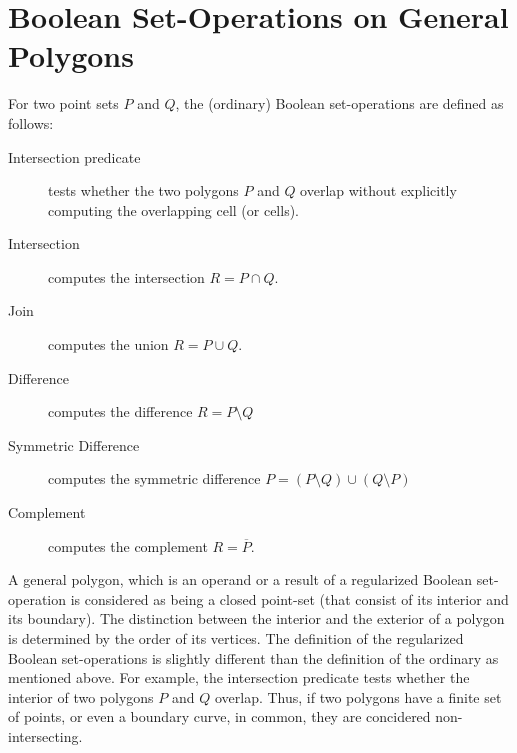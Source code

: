 \section{Boolean Set-Operations on General Polygons}
\label{bobs_sec:bops}
For two point sets $P$ and $Q$, the (ordinary) Boolean set-operations are
defined as follows:
\begin{description}
\item [Intersection predicate] tests whether the two polygons $P$ and $Q$
  overlap without explicitly computing the overlapping cell (or cells).     
\item[Intersection] computes the intersection $R = P \cap Q$.
\item[Join] computes the union $R = P \cup Q$.
\item [Difference] computes the difference $R = P \setminus Q$ 
\item [Symmetric Difference] computes the symmetric difference
  $P = (P \setminus Q) \cup (Q \setminus P)$
\item[Complement] computes the complement $R = \overline{P}$.
\end{description}

A general polygon, which is an operand or a result of a regularized
Boolean set-operation is considered as being a closed point-set (that
consist of its interior and its boundary). The distinction between the
interior and  the exterior of a polygon is determined by the order of
its vertices. The definition of the regularized Boolean set-operations 
is slightly different than the definition of the ordinary as mentioned
above. For example, the intersection predicate tests whether the
interior of two polygons $P$ and $Q$ overlap. Thus, if two polygons
have a finite set of points, or even a boundary curve, in common, they
are concidered non-intersecting.

